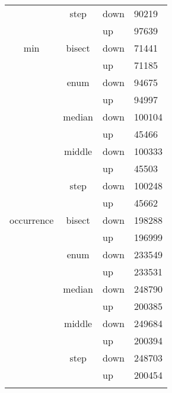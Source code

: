 \begin{longtable}{llll}
          & \multicolumn{1}{c}{step} & down  & 90219 \\
          &       & up    & 97639 \\\hline
    \multicolumn{1}{c}{min} & \multicolumn{1}{c}{bisect} & down  & 71441 \\
          &       & up    & 71185 \\
          & \multicolumn{1}{c}{enum} & down  & 94675 \\
          &       & up    & 94997 \\
          & \multicolumn{1}{c}{median} & down  & 100104 \\
          &       & up    & 45466 \\
          & \multicolumn{1}{c}{middle} & down  & 100333 \\
          &       & up    & 45503 \\ 
          & \multicolumn{1}{c}{step} & down  & 100248 \\
          &       & up    & 45662 \\\hline
    \multicolumn{1}{c}{occurrence} & \multicolumn{1}{c}{bisect} & down  & 198288 \\
          &       & up    & 196999 \\
          & \multicolumn{1}{c}{enum} & down  & 233549 \\
          &       & up    & 233531 \\
          & \multicolumn{1}{c}{median} & down  & 248790 \\
          &       & up    & 200385 \\
          & \multicolumn{1}{c}{middle} & down  & 249684 \\
          &       & up    & 200394 \\
          & \multicolumn{1}{c}{step} & down  & 248703 \\
          &       & up    & 200454 \\ \hline
  \label{tab: heuristicas_operandos}%
\end{longtable}%
